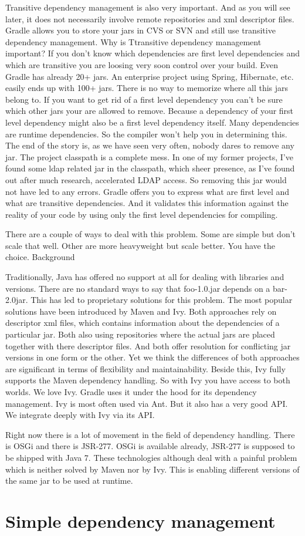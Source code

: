 Transitive dependency management is also very important. And as you will see later, it does not necessarily involve remote repositories and xml descriptor files. Gradle allows you to store your jars in CVS or SVN and still use transitive dependency management. Why is Ttransitive dependency management important? If you don't know which dependencies are first level dependencies and which are transitive you are loosing very soon control over your build. Even Gradle has already 20+ jars. An enterprise project using Spring, Hibernate, etc. easily ends up with 100+ jars. There is no way to memorize where all this jars belong to. If you want to get rid of a first level dependency you can't be sure which other jars your are allowed to remove. Because a dependency of your first level dependency might also be a first level dependency itself. Many dependencies are runtime dependencies. So the compiler won't help you in determining this. The end of the story is, as we have seen very often, nobody dares to remove any jar. The project classpath is a complete mess. In one of my former projects, I've found some ldap related jar in the classpath, which sheer presence, as I've found out after much research, accelerated LDAP access. So removing this jar would not have led to any errors. Gradle offers you to express what are first level and what are transitive dependencies. And it validates this information against the reality of your code by using only the first level dependencies for compiling.

There are a couple of ways to deal with this problem. Some are simple but don't scale that well. Other are more heavyweight but scale better. You have the choice.
Background

Traditionally, Java has offered no support at all for dealing with libraries and versions. There are no standard ways to say that foo-1.0.jar depends on a bar-2.0jar. This has led to proprietary solutions for this problem. The most popular solutions have been introduced by Maven and Ivy. Both approaches rely on descriptor xml files, which contains information about the dependencies of a particular jar. Both also using repositories where the actual jars are placed together with there descriptor files. And both offer resolution for conflicting jar versions in one form or the other. Yet we think the differences of both approaches are significant in terms of flexibility and maintainability. Beside this, Ivy fully supports the Maven dependency handling. So with Ivy you have access to both worlds. We love Ivy. Gradle uses it under the hood for its dependency management. Ivy is most often used via Ant. But it also has a very good API. We integrate deeply with Ivy via its API.

Right now there is a lot of movement in the field of dependency handling. There is OSGi and there is JSR-277. OSGi is available already, JSR-277 is supposed to be shipped with Java 7. These technologies although deal with a painful problem which is neither solved by Maven nor by Ivy. This is enabling different versions of the same jar to be used at runtime.

\section{Simple dependency management}